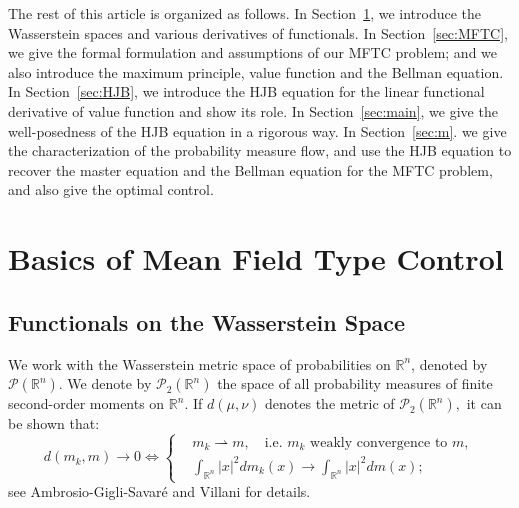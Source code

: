 \documentclass[11pt]{article}
\numberwithin{equation}{section}
\newcommand{\pr}{\mathcal{P}}
\newcommand{\brn}{{\mathbb{R}^n}}
\newcommand{\1}{\mbox{1\hspace{-1mm}I}}
\begin{document}
The rest of this article is organized as follows. In Section~\ref{sec:Basics}, we introduce the Wasserstein spaces and various derivatives of functionals. In Section~\ref{sec:MFTC}, we give the formal formulation and assumptions of our MFTC problem; and we also introduce the maximum principle, value function and the Bellman equation. In Section~\ref{sec:HJB}, we introduce the HJB equation for the linear functional derivative of value function and show its role. In Section~\ref{sec:main}, we give the well-posedness of the HJB equation in a rigorous way. In Section~\ref{sec:m}. we give the characterization of the probability measure flow, and use the HJB equation to recover the master equation and the Bellman equation for the MFTC problem, and also give the optimal control. 

\section{Basics of Mean Field Type Control}\label{sec:Basics}

\subsection{Functionals on the Wasserstein Space}

We work with the Wasserstein metric space of probabilities on $\brn$, denoted by $\pr(\brn)$. We denote by $\mathcal{P}_{2}(\brn)$ the space of all probability measures of finite second-order moments on $\brn$. If $d(\mu,\nu)$ denotes the metric of $\mathcal{P}_{2}(\brn),$ it can be shown that:
\begin{equation}\label{eq:1-100}
    d(m_{k},m)\rightarrow0\Longleftrightarrow 
    \left\{
    \begin{aligned}
        &m_{k}\rightharpoonup m, \quad \text{i.e. $m_{k}$ weakly convergence to $m$},\\
        &\int_{\brn}|x|^{2}dm_{k}(x)\rightarrow\int_{\brn}|x|^{2}dm(x);
    \end{aligned}
    \right.
\end{equation}
see Ambrosio-Gigli-Savar\'e \cite{AL} and Villani \cite{VC} for details.
\end{document}
